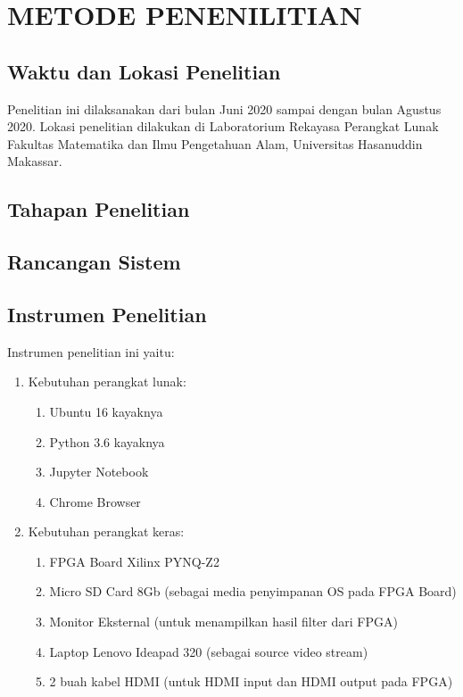 
\chapter{METODE PENENILITIAN}

\section{Waktu dan Lokasi Penelitian}
Penelitian ini dilaksanakan dari bulan Juni 2020 sampai dengan bulan Agustus 2020. Lokasi penelitian dilakukan di Laboratorium Rekayasa Perangkat Lunak Fakultas Matematika dan Ilmu Pengetahuan Alam, Universitas Hasanuddin Makassar.

\section{Tahapan Penelitian}

\section{Rancangan Sistem}

\section{Instrumen Penelitian}
Instrumen penelitian ini yaitu:
\begin{enumerate}[topsep=0pt,itemsep=0pt,partopsep=0pt, parsep=0pt]
    \item Kebutuhan perangkat lunak:
    \begin{enumerate}[topsep=0pt,itemsep=0pt,partopsep=0pt, parsep=0pt, label=\textbf{\alph*.}]
        \item Ubuntu 16 kayaknya 
        \item Python 3.6 kayaknya
        \item Jupyter Notebook
        \item Chrome Browser 
    \end{enumerate}
    \item Kebutuhan perangkat keras:
    \begin{enumerate}[topsep=0pt,itemsep=0pt,partopsep=0pt, parsep=0pt, label=\textbf{\alph*.}]
        \item FPGA Board Xilinx PYNQ-Z2
        \item Micro SD Card 8Gb (sebagai media penyimpanan OS pada FPGA Board)
        \item Monitor Eksternal (untuk menampilkan hasil filter dari FPGA)
        \item Laptop Lenovo Ideapad 320 (sebagai source video stream)
        \item 2 buah kabel HDMI (untuk HDMI input dan HDMI output pada FPGA) 
    \end{enumerate}
\end{enumerate}
